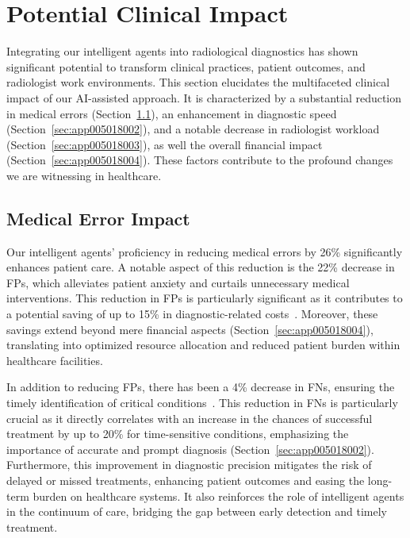 \section{Potential Clinical Impact}
\label{sec:app005018}

\textcolor{revised}{Integrating our intelligent agents into radiological diagnostics has shown significant potential to transform clinical practices, patient outcomes, and radiologist work environments.
This section elucidates the multifaceted clinical impact of our \ac{AI}-assisted approach.
It is characterized by a substantial reduction in medical errors (Section~\ref{sec:app005018001}), an enhancement in diagnostic speed (Section~\ref{sec:app005018002}), and a notable decrease in radiologist workload (Section~\ref{sec:app005018003}), as well the overall financial impact (Section~\ref{sec:app005018004}).
These factors contribute to the profound changes we are witnessing in healthcare.}

\subsection{Medical Error Impact}
\label{sec:app005018001}

\textcolor{revised}{Our intelligent agents' proficiency in reducing medical errors by 26\% significantly enhances patient care.
A notable aspect of this reduction is the 22\% decrease in \acp{FP}, which alleviates patient anxiety and curtails unnecessary medical interventions.
This reduction in \acp{FP} is particularly significant as it contributes to a potential saving of up to 15\% in diagnostic-related costs~\cite{10.1001/jamainternmed.2015.5231}.
Moreover, these savings extend beyond mere financial aspects (Section~\ref{sec:app005018004}), translating into optimized resource allocation and reduced patient burden within healthcare facilities.}

\textcolor{revised}{In addition to reducing \acp{FP}, there has been a 4\% decrease in \acp{FN}, ensuring the timely identification of critical conditions~\cite{doi:10.3322/caac.21492}.
This reduction in \acp{FN} is particularly crucial as it directly correlates with an increase in the chances of successful treatment by up to 20\% for time-sensitive conditions, emphasizing the importance of accurate and prompt diagnosis (Section~\ref{sec:app005018002}).
Furthermore, this improvement in diagnostic precision mitigates the risk of delayed or missed treatments, enhancing patient outcomes and easing the long-term burden on healthcare systems.
It also reinforces the role of intelligent agents in the continuum of care, bridging the gap between early detection and timely treatment.}


